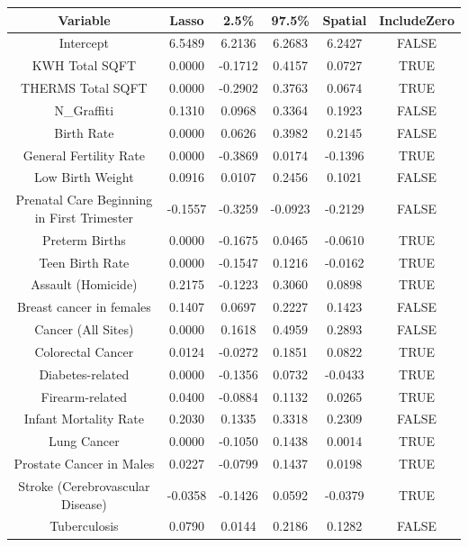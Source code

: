 \documentclass{article} %
\begin{document}
\begin{table}[H]
\centering
\begin{adjustbox}{width = \textwidth}
\begin{tabular}{cccccc}
  \hline
Variable & Lasso & 2.5\% & 97.5\% & Spatial & IncludeZero \\ 
  \hline
Intercept & 6.5489 & 6.2136 & 6.2683 & 6.2427 & FALSE \\ 
  KWH Total SQFT & 0.0000 & -0.1712 & 0.4157 & 0.0727 & TRUE \\ 
  THERMS Total SQFT & 0.0000 & -0.2902 & 0.3763 & 0.0674 & TRUE \\ 
  N\_Graffiti & 0.1310 & 0.0968 & 0.3364 & 0.1923 & FALSE \\ 
  Birth Rate & 0.0000 & 0.0626 & 0.3982 & 0.2145 & FALSE \\ 
  General Fertility Rate & 0.0000 & -0.3869 & 0.0174 & -0.1396 & TRUE \\ 
  Low Birth Weight & 0.0916 & 0.0107 & 0.2456 & 0.1021 & FALSE \\ 
  Prenatal Care Beginning in First Trimester & -0.1557 & -0.3259 & -0.0923 & -0.2129 & FALSE \\ 
  Preterm Births & 0.0000 & -0.1675 & 0.0465 & -0.0610 & TRUE \\ 
  Teen Birth Rate & 0.0000 & -0.1547 & 0.1216 & -0.0162 & TRUE \\ 
  Assault (Homicide) & 0.2175 & -0.1223 & 0.3060 & 0.0898 & TRUE \\ 
  Breast cancer in females & 0.1407 & 0.0697 & 0.2227 & 0.1423 & FALSE \\ 
  Cancer (All Sites) & 0.0000 & 0.1618 & 0.4959 & 0.2893 & FALSE \\ 
  Colorectal Cancer & 0.0124 & -0.0272 & 0.1851 & 0.0822 & TRUE \\ 
  Diabetes-related & 0.0000 & -0.1356 & 0.0732 & -0.0433 & TRUE \\ 
  Firearm-related & 0.0400 & -0.0884 & 0.1132 & 0.0265 & TRUE \\ 
  Infant Mortality Rate & 0.2030 & 0.1335 & 0.3318 & 0.2309 & FALSE \\ 
  Lung Cancer & 0.0000 & -0.1050 & 0.1438 & 0.0014 & TRUE \\ 
  Prostate Cancer in Males & 0.0227 & -0.0799 & 0.1437 & 0.0198 & TRUE \\ 
  Stroke (Cerebrovascular Disease) & -0.0358 & -0.1426 & 0.0592 & -0.0379 & TRUE \\ 
  Tuberculosis & 0.0790 & 0.0144 & 0.2186 & 0.1282 & FALSE \\ 

\end{tabular}
\end{adjustbox}
\end{table}
\end{document}
